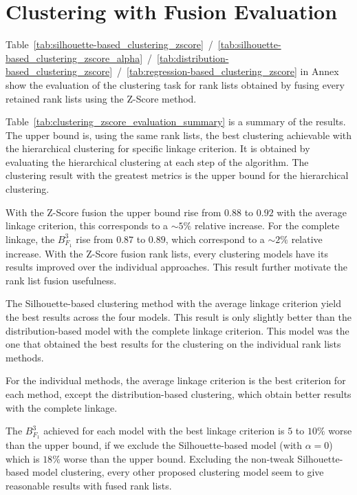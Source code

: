 \section{Clustering with Fusion Evaluation}

Table~\ref{tab:silhouette-based_clustering_zscore}~/~\ref{tab:silhouette-based_clustering_zscore_alpha}~/~\ref{tab:distribution-based_clustering_zscore}~/~\ref{tab:regression-based_clustering_zscore} in Annex show the evaluation of the clustering task for rank lists obtained by fusing every retained rank lists using the Z-Score method.

Table~\ref{tab:clustering_zscore_evaluation_summary} is a summary of the results.
The upper bound is, using the same rank lists, the best clustering achievable with the hierarchical clustering for specific linkage criterion.
It is obtained by evaluating the hierarchical clustering at each step of the algorithm.
The clustering result with the greatest metrics is the upper bound for the hierarchical clustering.

With the Z-Score fusion the upper bound rise from $0.88$ to $0.92$ with the average linkage criterion, this corresponds to a $\sim 5\%$ relative increase.
For the complete linkage, the $B^{3}_{F_1}$ rise from $0.87$ to $0.89$, which correspond to a $\sim 2\%$ relative increase.
With the Z-Score fusion rank lists, every clustering models have its results improved over the individual approaches.
This result further motivate the rank list fusion usefulness.

The Silhouette-based clustering method with the average linkage criterion yield the best results across the four models.
This result is only slightly better than the distribution-based model with the complete linkage criterion.
This model was the one that obtained the best results for the clustering on the individual rank lists methods.

For the individual methods, the average linkage criterion is the best criterion for each method, except the distribution-based clustering, which obtain better results with the complete linkage.

The $B^{3}_{F_1}$ achieved for each model with the best linkage criterion is $5$ to $10\%$ worse than the upper bound, if we exclude the Silhouette-based model (with $\alpha = 0$) which is $18\%$ worse than the upper bound.
Excluding the non-tweak Silhouette-based model clustering, every other proposed clustering model seem to give reasonable results with fused rank lists.

